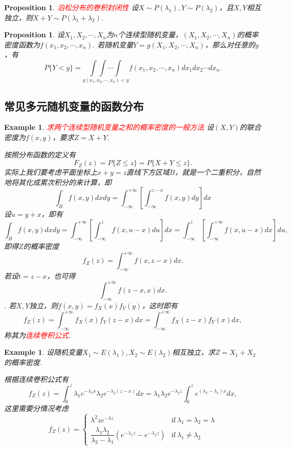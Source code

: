 \documentclass{article}
\newtheorem{proposition}[theorem]{Proposition}
\newtheorem{example}[theorem]{Example}
\newcommand{\redt}[1]{\textcolor{red}{#1}}
\begin{document}
\begin{proposition}
\rm \redt{泊松分布的卷积封闭性} 设$X \sim P(\lambda_1),Y \sim P(\lambda_2)$，且$X,Y$相互独立，则$X+Y \sim P(\lambda_1 + \lambda_2)$. 
\end{proposition}

\begin{proposition}
\rm 设$X_1,X_2,\cdots,X_n$为$n$个连续型随机变量，$(X_1,X_2,\cdots,X_n)$的概率密度函数为$f(x_1,x_2,\cdots,x_n)$. 若随机变量$Y=g(X_1,X_2,\cdots,X_n)$，那么对任意的$y$，有
$$
P\{Y < y\} = \underset{g(x_1,x_2,\cdots,x_n) < y}{\int\int\cdots\int}f(x_1,x_2,\cdots,x_n)dx_1dx_2\cdots dx_n.
$$
\end{proposition}


\subsection{常见多元随机变量的函数分布}

\begin{example}
\rm \redt{求两个连续型随机变量之和的概率密度的一般方法} 设$(X,Y)$的联合密度为$f(x,y)$，要求$Z=X+Y$.

按照分布函数的定义有
$$
F_Z(z)=P\{Z \leq z\} = P\{X+Y \leq z\}.
$$
实际上我们要考虑平面坐标上$x+y=z$直线下方区域$B$，就是一个二重积分，自然地将其化成累次积分的来计算，即
$$
\int_{B} f(x,y)dxdy = \int_{-\infty}^{+\infty}\left[ \int_{-\infty}^{z-x} f(x,y)dy \right] dx
$$
设$u = y+x$，即有
$$
\int_{B} f(x,y)dxdy = \int_{-\infty}^{+\infty}\left[ \int_{-\infty}^{z} f(x,u-x)du \right] dx = \int_{-\infty}^{z} \left[ \int_{-\infty}^{+\infty} f(x,u-x)dx \right] du, 
$$
即得$Z$的概率密度
$$
f_Z(z) = \int_{-\infty}^{+\infty} f(x,z-x)dx.
$$
若设$t=z-x$，也可得
$$
\int_{-\infty}^{+\infty} f(z-x,x)dx.
$$.
若$X,Y$独立，则$f(x,y)=f_X(x)f_Y(y)$，这时即有
$$
f_Z(z) = \int_{-\infty}^{+\infty} f_X(x)f_Y(z-x)dx = \int_{-\infty}^{+\infty} f_X(z-x)f_Y(x)dx,
$$
称其为\redt{连续卷积公式}. 
\end{example}

\begin{example}
\rm 设随机变量$X_1 \sim E(\lambda_1),X_2 \sim E(\lambda_2)$相互独立，求$Z = X_1 + X_2$的概率密度. 

根据连续卷积公式有
$$
f_Z(z) = \int_0^{z} \lambda_1 e^{-\lambda_1x}\lambda_2 e^{-\lambda_2(z-x)}dx = \lambda_1\lambda_2 e^{-\lambda_2z} \int_0^{z} e^{(\lambda_2 - \lambda_1)x}dx,   
$$
这里需要分情况考虑
$$
f_Z(z) = \left \{ \begin{array}{ll}
\lambda^2 ze^{-\lambda z} & \text{if}~\lambda_1 = \lambda_2 = \lambda \\
\dfrac {\lambda _{1}\lambda _{2}}{\lambda _{2}-\lambda _{1}}\left(e^{-\lambda _{1}z}-e^{-\lambda _{2}z}\right) & \text{if}~\lambda_1 \neq \lambda_2
\end{array} \right.
$$
\end{example}
\end{document}
